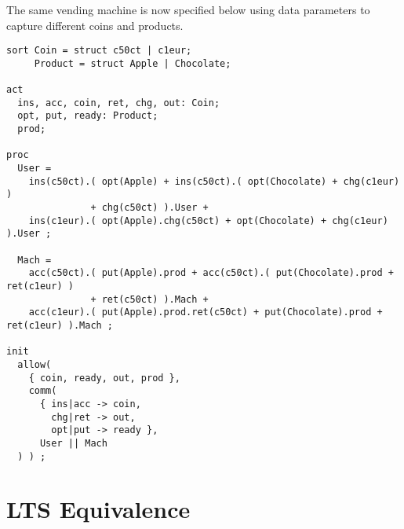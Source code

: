\documentclass[11pt]{article}
\begin{document}
\begin{exercise}
The same vending machine is now specified below using data parameters to capture different coins and products.

\begin{lstlisting}
sort Coin = struct c50ct | c1eur;
     Product = struct Apple | Chocolate;

act
  ins, acc, coin, ret, chg, out: Coin;
  opt, put, ready: Product;
  prod;

proc
  User = 
    ins(c50ct).( opt(Apple) + ins(c50ct).( opt(Chocolate) + chg(c1eur) )
               + chg(c50ct) ).User +
    ins(c1eur).( opt(Apple).chg(c50ct) + opt(Chocolate) + chg(c1eur) ).User ;

  Mach = 
    acc(c50ct).( put(Apple).prod + acc(c50ct).( put(Chocolate).prod + ret(c1eur) )
               + ret(c50ct) ).Mach +
    acc(c1eur).( put(Apple).prod.ret(c50ct) + put(Chocolate).prod + ret(c1eur) ).Mach ;

init
  allow(
    { coin, ready, out, prod },
    comm(
      { ins|acc -> coin,
        chg|ret -> out,
        opt|put -> ready },
      User || Mach
  ) ) ;  
\end{lstlisting}



\end{exercise}

\section*{LTS Equivalence}
\end{document}
